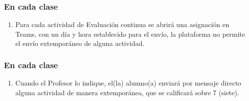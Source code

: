 \documentclass[14pt]{beamer}
\begin{document}
\begin{frame}
\frametitle{En cada clase}
\begin{enumerate}[<+->]
\conti
\item Para cada actividad de Evaluación continua se abrirá una asignación en Teams, con un día y hora establecido para el envío, la plataforma no permite el envío extemporáneo de alguna actividad.
\seti
\end{enumerate}
\end{frame}
\begin{frame}
\frametitle{En cada clase}
\begin{enumerate}[<+->]
\conti
\item Cuando el Profesor lo indique, el(la) alumno(a) enviará por mensaje directo alguna actividad de manera extemporánea, que se calificará sobre 7 (siete).
\end{enumerate}
\end{frame}

    

\end{document}
